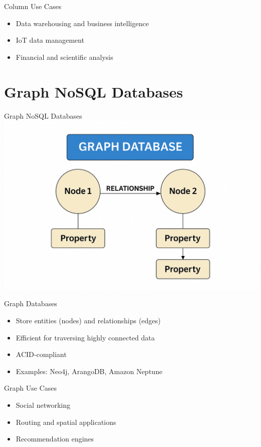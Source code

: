 \documentclass{beamer}
\begin{document}
\begin{frame}{Column Use Cases}
\begin{itemize}
    \item Data warehousing and business intelligence
    \item IoT data management
    \item Financial and scientific analysis
\end{itemize}
\end{frame}

\section{Graph NoSQL Databases}

\begin{frame}{\centering Graph NoSQL Databases}
\centering
\includegraphics[width=0.6\linewidth]{figures/graph_db_diagram}
\end{frame}

\begin{frame}{Graph Databases}
\begin{itemize}
    \item Store entities (nodes) and relationships (edges)
    \item Efficient for traversing highly connected data
    \item ACID-compliant
    \item Examples: Neo4j, ArangoDB, Amazon Neptune
\end{itemize}
\end{frame}

\begin{frame}{Graph Use Cases}
\begin{itemize}
    \item Social networking
    \item Routing and spatial applications
    \item Recommendation engines
\end{itemize}
\end{frame}
\end{document}
